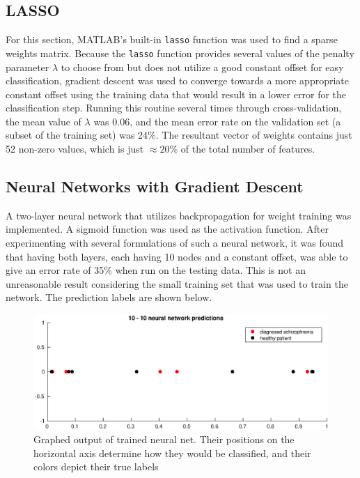 \documentclass{article}
\begin{document}
\subsection{LASSO}
For this section, MATLAB's built-in \verb!lasso! function was used to find a sparse weights matrix. Because the \verb!lasso! function provides several values of the penalty parameter $\lambda$ to choose from but does not utilize a good constant offset for easy classification, gradient descent was used to converge towards a more appropriate constant offset using the training data that would result in a lower error for the classification step. Running this routine several times through cross-validation, the mean value of $\lambda$ was 0.06, and the mean error rate on the validation set (a subset of the training set) was 24\%. The resultant vector of weights contains just 52 non-zero values, which is just $\approx 20\%$ of the total number of features. 

\subsection{Neural Networks with Gradient Descent}
A two-layer neural network that utilizes backpropagation for weight training was implemented. A sigmoid function was used as the activation function. After experimenting with several formulations of such a neural network, it was found that having both layers, each having 10 nodes and a constant offset, was able to give an error rate of 35\% when run on the testing data. This is not an unreasonable result considering the small training set that was used to train the network. The prediction labels are shown below.

\begin{figure}[H] 
    \centering
    \includegraphics[width = \textwidth]{Figures/neuralnet.eps}
    \caption{Graphed output of trained neural net. Their positions on the horizontal axis determine how they would be classified, and their colors depict their true labels}
\end{figure}
\end{document}
